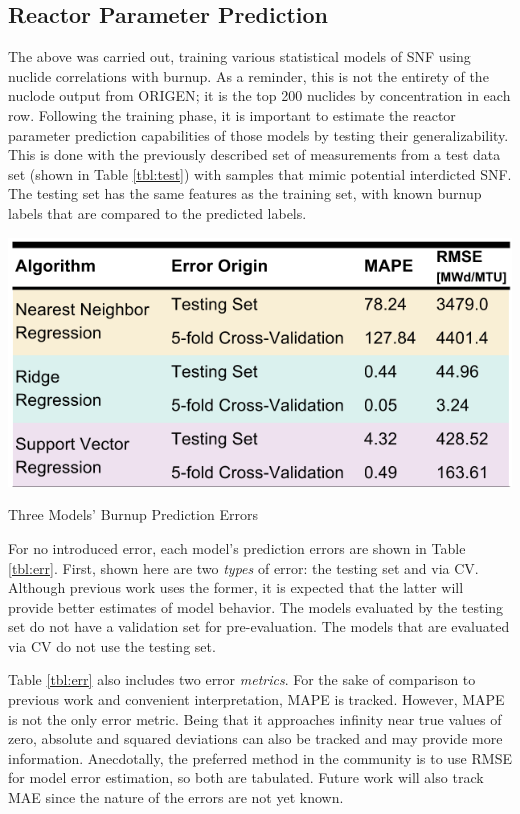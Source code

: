 \subsection{Reactor Parameter Prediction}
\label{sec:rxtrparam}

The above was carried out, training various statistical models of \gls{SNF}
using nuclide correlations with burnup. As a reminder, this is not the entirety
of the nuclode output from \gls{ORIGEN}; it is the top 200 nuclides by
concentration in each row. Following the training phase, it is important to
estimate the reactor parameter prediction capabilities of those models by
testing their generalizability.  This is done with the previously described set
of measurements from a test data set (shown in Table \ref{tbl:test}) with
samples that mimic potential interdicted \gls{SNF}. The testing set has the
same features as the training set, with known burnup labels that are compared
to the predicted labels. 

\begin{table}[!htb]
  \centering
  \includegraphics[width=0.8\linewidth]{./chapters/demo_method/results1.png}
  \caption{Three Models' Burnup Prediction Errors}
  \label{tbl:err}
\end{table}

For no introduced error, each model's prediction errors are shown in Table
\ref{tbl:err}.  First, shown here are two \textit{types} of error: the testing
set and via \gls{CV}.  Although previous work uses the former, it is expected
that the latter will provide better estimates of model behavior.  The models
evaluated by the testing set do not have a validation set for pre-evaluation.
The models that are evaluated via \gls{CV} do not use the testing set. 

Table \ref{tbl:err} also includes two error \textit{metrics}.  For the sake of
comparison to previous work and convenient interpretation, \gls{MAPE} is
tracked. However, \gls{MAPE} is not the only error metric. Being that it
approaches infinity near true values of zero, absolute and squared deviations
can also be tracked and may provide more information.  Anecdotally, the
preferred method in the community is to use \gls{RMSE} for model error
estimation, so both are tabulated.  Future work will also track \gls{MAE} since
the nature of the errors are not yet known.  

